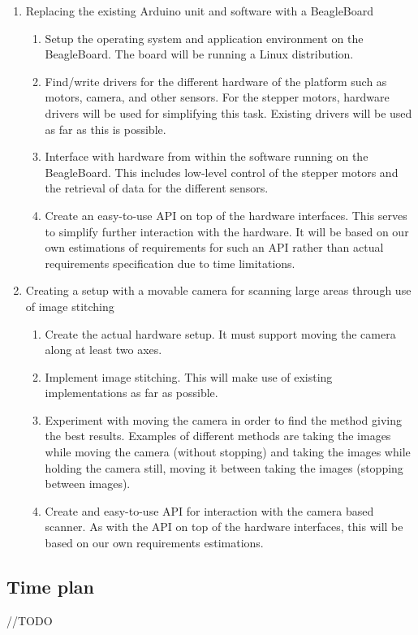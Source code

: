 \documentclass[a4paper,11pt]{article}
\begin{document}
\begin{enumerate}

    \item Replacing the existing Arduino unit and software with a BeagleBoard
    \begin{enumerate}
        \item
          Setup the operating system and application environment on the
          BeagleBoard. The board will be running a Linux distribution.
        \item
          Find/write drivers for the different hardware of the platform such as
          motors, camera, and other sensors. For the stepper motors, hardware
          drivers will be used for simplifying this task. Existing drivers will
          be used as far as this is possible.
        \item
          Interface with hardware from within the software running on the
          BeagleBoard. This includes low-level control of the stepper motors and
          the retrieval of data for the different sensors.
        \item
          Create an easy-to-use API on top of the hardware interfaces. This
          serves to simplify further interaction with the hardware. It will be
          based on our own estimations of requirements for such an API rather
          than actual requirements specification due to time limitations.
    \end{enumerate}

    \item Creating a setup with a movable camera for scanning large
    areas through use of image stitching
    \begin{enumerate}
        \item
          Create the actual hardware setup. It must support moving the camera
          along at least two axes.
        \item
          Implement image stitching. This will make use of existing
          implementations as far as possible.
        \item
          Experiment with moving the camera in order to find the method giving
          the best results. Examples of different methods are taking the images
          while moving the camera (without stopping) and taking the images while
          holding the camera still, moving it between taking the images
          (stopping between images).
        \item
          Create and easy-to-use API for interaction with the camera based
          scanner. As with the API on top of the hardware interfaces, this will
          be based on our own requirements estimations.
    \end{enumerate}

\end{enumerate}

\subsection{Time plan}
//TODO
\end{document}
